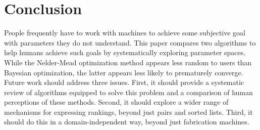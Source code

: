 \section{Conclusion}

People frequently have to work with machines to achieve some subjective goal with parameters they do not understand.
This paper compares two algorithms to help humans achieve such goals by systematically exploring parameter spaces.
While the Nelder-Mead optimization method appears less random to users than Bayesian optimization, the latter appears less likely to prematurely converge.
Future work should address three issues.
First, it should provide a systematic review of algorithms equipped to solve this problem and a comparison of human perceptions of these methods.
Second, it should explore a wider range of mechanisms for expressing rankings, beyond just pairs and sorted lists.
Third, it should do this in a domain-independent way, beyond just fabrication machines.
